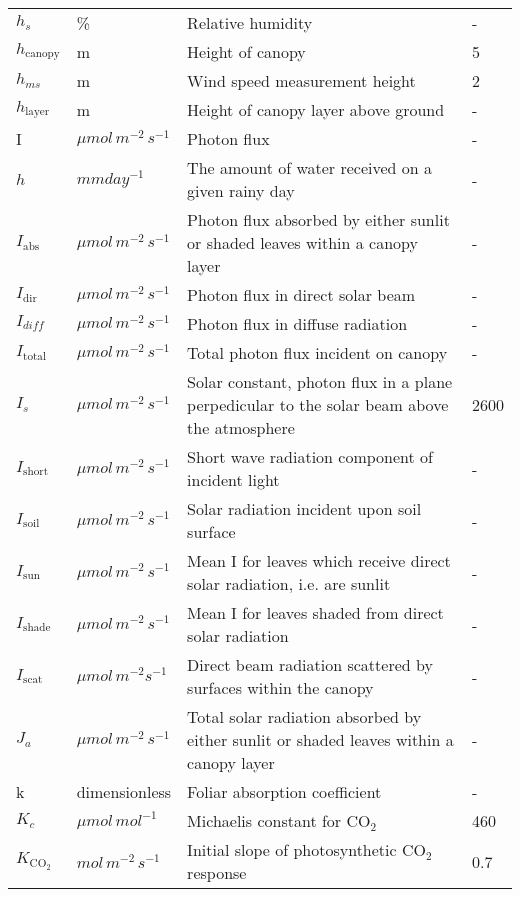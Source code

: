 \documentclass[12pt,fullpage]{report}
\begin{document}
\begin{center}
\begin{longtable}{l l p{3in} p{0.5in}}
$h_s$	&	\%	&	Relative humidity	&	-	\\
$h_{\text{canopy}}$	&	m	&	Height of canopy	&	5	\\
$h_{ms}$	&	m	&	Wind speed measurement height	&	2	\\
$h_{\text{layer}}$	&	m	&	Height of canopy layer above ground	&	-	\\
	I&	$\mu mol\, m^{-2}\, s^{-1}$ 	&	Photon flux	&	-	\\
$h$	&	$mm day^{-1}$	&	The amount of water received on a given rainy day	&	-	\\
$I_{\text{abs}}$	&	$\mu mol\, m^{-2}\, s^{-1}$ 	&	Photon flux absorbed by either sunlit or shaded leaves within a canopy layer	&	-	\\
$I_{\text{dir}}$	&	$\mu mol\, m^{-2}\, s^{-1}$ 	&	Photon flux in direct solar beam	&	-	\\
$I_{\mathit{\text{diff}}}$	&	$\mu mol\,m^{-2}\, s^{-1}$ 	&	Photon flux in diffuse radiation	&	-	\\
$I_{\text{total}}$	&	$\mu mol\, m^{-2}\, s^{-1}$ 	&	Total photon flux incident on canopy	&	-	\\
$I_s$	&	$\mu mol\, m^{-2}\, s^{-1}$ 	&	Solar constant, photon flux in a plane perpedicular to the solar beam above the atmosphere	&	2600	\\
$I_{\text{short}}$	&	$\mu mol\, m^{-2}\, s^{-1}$ 	&	Short wave radiation component of incident light	&	-	\\
$I_{\text{soil}}$	&	$\mu mol\, m^{-2}\, s^{-1}$ 	&	Solar radiation incident upon soil surface	&	-	\\
$I_{\text{sun}}$	&	$\mu mol\, m^{-2}\, s^{-1}$ 	&	Mean I for leaves which receive direct solar radiation, i.e. are sunlit	&	-	\\
$I_{\text{shade}}$	&	$\mu mol\, m^{-2}\, s^{-1}$ 	&	Mean I for leaves shaded from direct solar radiation	&	-	\\
$I_{\text{scat}}$	&	$\mu mol\, m^{-2} s^{-1}$ 	&	Direct beam radiation scattered by surfaces within the canopy	&	-	\\
$J_{a}$	&	$\mu mol\, m^{-2}\, s^{-1}$ 	&	Total solar radiation absorbed by either sunlit or shaded leaves within a canopy layer	&	-	\\
	k&	dimensionless	&	Foliar absorption coefficient	&	-	\\
$K_c$	&	$\mu mol\, mol^{-1}$ 	&	Michaelis constant for CO$_2$	&	460	\\
$K_{\text{CO}_2}$  	&	$mol\, m^{-2}\, s^{-1}$ 	&	Initial slope of photosynthetic CO$_2$ response	&	0.7	\\

\end{longtable}
\end{center}
\end{document}
